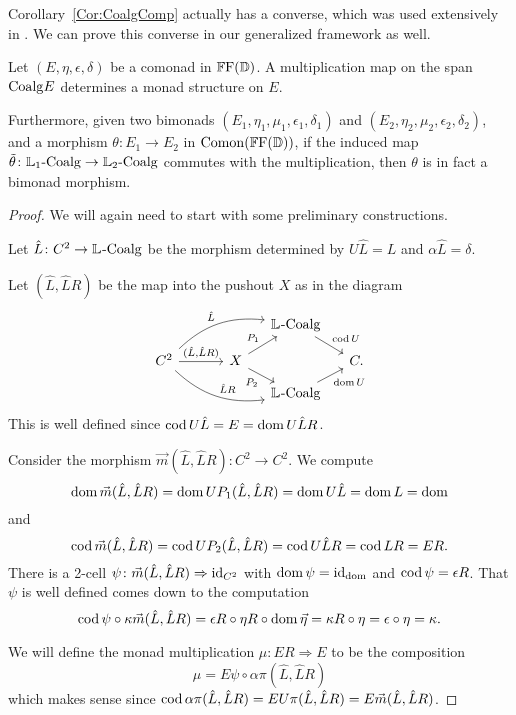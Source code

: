 Corollary~\ref{Cor:CoalgComp} actually has a converse, which was used extensively in \cite{riehl:nwfs-model}. We can prove this converse in our generalized framework as well.

\begin{proposition}
	Let $(E,\eta,\epsilon,\delta)$ be a comonad in $\FFD$. A multiplication map on the span $\Coalg E$ determines a monad structure on $E$. 

	Furthermore, given two bimonads $(E_1,\eta_1,\mu_1,\epsilon_1,\delta_1)$ and $(E_2,\eta_2,\mu_2,\epsilon_2,\delta_2)$, and a morphism $\theta\colon E_1\to E_2$ in $\Comon(\FFD)$, if the induced map $\tilde{\theta}\colon\LCoalg[1]\to\LCoalg[2]$ commutes with the multiplication, then $\theta$ is in fact a bimonad morphism.
\end{proposition}
\begin{proof}
	We will again need to start with some preliminary constructions.

	Let $\hat{L}\colon C^2\to\LCoalg$ be the morphism determined by $U\hat{L}=L$ and $\alpha\hat{L}=\delta$.

	Let $(\hat{L},\hat{L}R)$ be the map into the pushout $X$ as in the diagram
	\[
	\begin{tikzcd}[row sep=small,column sep=small,bend angle=25]
		{} &[2em]& \LCoalg \drar{\cod U} & \\
		C^2 \ar[bend left]{urr}{\hat{L}}
			\rar{(\hat{L},\hat{L}R)}
			\ar[bend right]{drr}{\hat{L}R}
		& X \urar{P_1} \drar[swap]{P_2}
		&& C. \\
		&& \LCoalg \urar[swap]{\dom U} &
	\end{tikzcd}
	\]
	This is well defined since $\cod U\hat{L}=E=\dom U\hat{L}R$.

	Consider the morphism $\vec{m}(\hat{L},\hat{L}R)\colon C^2\to C^2$. We compute
	\[
		\dom\vec{m}(\hat{L},\hat{L}R) = \dom UP_1(\hat{L},\hat{L}R) = \dom U\hat{L} = \dom L = \dom
	\]
	and
	\[
		\cod\vec{m}(\hat{L},\hat{L}R) = \cod UP_2(\hat{L},\hat{L}R) = \cod U\hat{L}R = \cod LR = ER.
	\]
	There is a 2-cell $\psi\colon\vec{m}(\hat{L},\hat{L}R)\Rightarrow\id_{C^2}$ with $\dom\psi=\id_{\dom}$ and $\cod\psi=\epsilon R$. That $\psi$ is well defined comes down to the computation
	\[
		\cod\psi \circ \kappa\vec{m}(\hat{L},\hat{L}R) = \epsilon R \circ \eta R \circ \dom\vec{\eta} = \kappa R \circ \eta = \epsilon\circ\eta = \kappa.
	\]

	We will define the monad multiplication $\mu\colon ER\Rightarrow E$ to be the composition
	\[
		\mu = E\psi \circ \alpha\pi(\hat{L},\hat{L}R)
	\]
	which makes sense since $\cod\alpha\pi(\hat{L},\hat{L}R) = EU\pi(\hat{L},\hat{L}R)=E\vec{m}(\hat{L},\hat{L}R)$.
\end{proof}